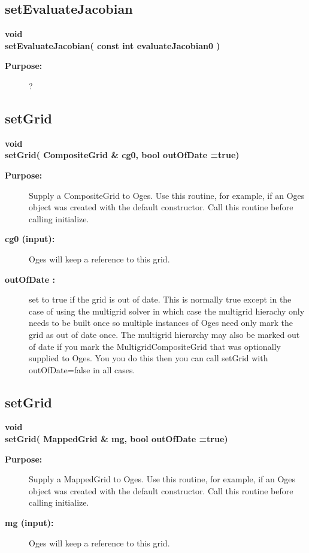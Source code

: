 \subsection{setEvaluateJacobian}
 
\begin{flushleft} \textbf{%
void  \\ 
\settowidth{\OgesIncludeArgIndent}{setEvaluateJacobian(}%
setEvaluateJacobian( const int evaluateJacobian0 )
}\end{flushleft}
\begin{description}
\item[{\bf Purpose:}]  ?
\end{description}
\subsection{setGrid}
 
\begin{flushleft} \textbf{%
void  \\ 
\settowidth{\OgesIncludeArgIndent}{setGrid(}%
setGrid( CompositeGrid \& cg0, bool outOfDate  =true)
}\end{flushleft}
\begin{description}
\item[{\bf Purpose:}] 
 Supply a CompositeGrid to Oges. Use this routine, for example,
 if an Oges object was created with the default constructor.
 Call this routine before calling initialize.
\item[{\bf cg0 (input):}]  Oges will keep a reference to this grid.
\item[{\bf outOfDate :}]  set to true if the grid is out of date. This is normally true except in the case
    of using the multigrid solver in which case the multigrid hierachy only needs to be built once
    so multiple instances of Oges need only mark the grid as out of date once. The multigrid hierarchy
   may also be marked out of date if you mark the MultigridCompositeGrid that was optionally supplied to Oges.
  You you do this then you can call setGrid with outOfDate=false in all cases.
\end{description}
\subsection{setGrid}
 
\begin{flushleft} \textbf{%
void  \\ 
\settowidth{\OgesIncludeArgIndent}{setGrid(}%
setGrid( MappedGrid \& mg, bool outOfDate  =true)
}\end{flushleft}
\begin{description}
\item[{\bf Purpose:}] 
 Supply a MappedGrid to Oges. Use this routine, for example,
 if an Oges object was created with the default constructor.
 Call this routine before calling initialize.
\item[{\bf mg (input):}]  Oges will keep a reference to this grid.
\end{description}
